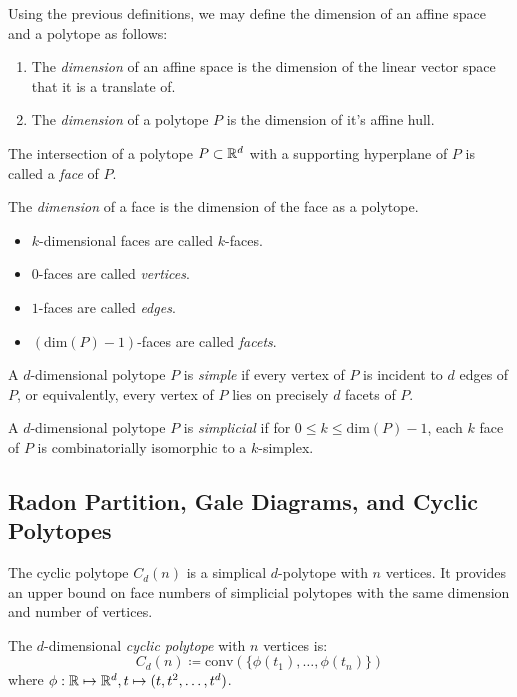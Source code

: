 \begin{definition}[Dimension]
    Using the previous definitions, we may define the dimension of an affine space and a polytope as follows:
    \begin{enumerate}
        \item The \textit{dimension} of an affine space is the dimension of the linear vector space that it is a translate of.
        \item The \textit{dimension} of a polytope $P$ is the dimension of it's affine hull.
    \end{enumerate}
\end{definition}

\begin{definition}
    The intersection of a polytope $P \subset \mathbb{R}^d$ with a supporting hyperplane of $P$ is called a \textit{face} of $P$.

    The \textit{dimension} of a face is the dimension of the face as a polytope.
    \begin{itemize}
        \item $k$-dimensional faces are called $k$-faces.
        \item $0$-faces are called \textit{vertices}.
        \item $1$-faces are called \textit{edges}.
        \item $(\text{dim}(P) - 1)$-faces are called \textit{facets}.
    \end{itemize}
\end{definition}

\begin{definition}
    A $d$-dimensional polytope $P$ is \textit{simple} if every vertex of $P$ is incident to $d$ edges of $P$, or equivalently, every vertex of $P$ lies on precisely $d$ facets of $P$.

    A $d$-dimensional polytope $P$ is \textit{simplicial} if for $0 \leq k \leq \text{dim}(P) - 1$, each $k$ face of $P$ is combinatorially isomorphic to a $k$-simplex.
\end{definition}

\subsection{Radon Partition, Gale Diagrams, and Cyclic Polytopes}

The cyclic polytope $C_d(n)$ is a simplical $d$-polytope with $n$ vertices.
It provides an upper bound on face numbers of simplicial polytopes with the same dimension and number of vertices.
\begin{definition}
    The $d$-dimensional \textit{cyclic polytope} with $n$ vertices is:
    $$C_d(n) \coloneqq \text{conv}(\{\phi(t_1), \dots,  \phi(t_n)\})$$
    where $\phi : \mathbb{R} \mapsto \mathbb{R}^d, t \mapsto (t, t^2, \dots, t^d)$.
\end{definition}

